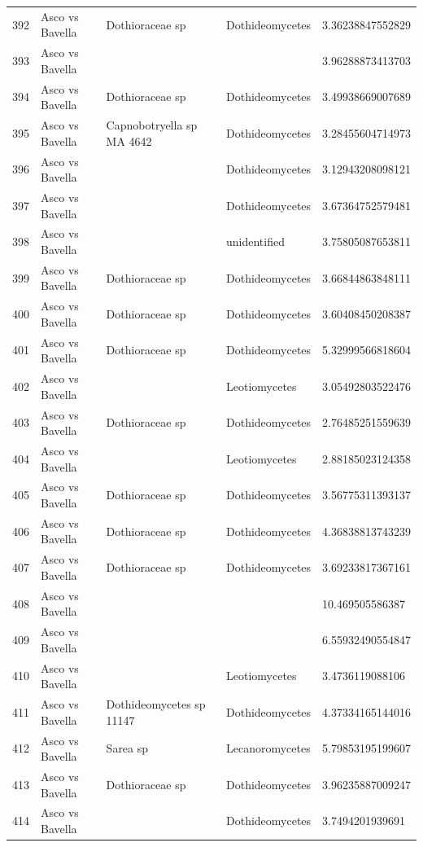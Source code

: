 \documentclass[12pt]{article}\usepackage[]{graphicx}\usepackage[]{color}
\numberwithin{figure}{section}
\begin{document}
\begin{table}[ht]
\begin{tabular}{lllll}
  392 & Asco vs Bavella & Dothioraceae sp & Dothideomycetes & 3.36238847552829 \\ 
  393 & Asco vs Bavella &  &  & 3.96288873413703 \\ 
  394 & Asco vs Bavella & Dothioraceae sp & Dothideomycetes & 3.49938669007689 \\ 
  395 & Asco vs Bavella & Capnobotryella sp MA 4642 & Dothideomycetes & 3.28455604714973 \\ 
  396 & Asco vs Bavella &  & Dothideomycetes & 3.12943208098121 \\ 
  397 & Asco vs Bavella &  & Dothideomycetes & 3.67364752579481 \\ 
  398 & Asco vs Bavella &  & unidentified & 3.75805087653811 \\ 
  399 & Asco vs Bavella & Dothioraceae sp & Dothideomycetes & 3.66844863848111 \\ 
  400 & Asco vs Bavella & Dothioraceae sp & Dothideomycetes & 3.60408450208387 \\ 
  401 & Asco vs Bavella & Dothioraceae sp & Dothideomycetes & 5.32999566818604 \\ 
  402 & Asco vs Bavella &  & Leotiomycetes & 3.05492803522476 \\ 
  403 & Asco vs Bavella & Dothioraceae sp & Dothideomycetes & 2.76485251559639 \\ 
  404 & Asco vs Bavella &  & Leotiomycetes & 2.88185023124358 \\ 
  405 & Asco vs Bavella & Dothioraceae sp & Dothideomycetes & 3.56775311393137 \\ 
  406 & Asco vs Bavella & Dothioraceae sp & Dothideomycetes & 4.36838813743239 \\ 
  407 & Asco vs Bavella & Dothioraceae sp & Dothideomycetes & 3.69233817367161 \\ 
  408 & Asco vs Bavella &  &  & 10.469505586387 \\ 
  409 & Asco vs Bavella &  &  & 6.55932490554847 \\ 
  410 & Asco vs Bavella &  & Leotiomycetes & 3.4736119088106 \\ 
  411 & Asco vs Bavella & Dothideomycetes sp 11147 & Dothideomycetes & 4.37334165144016 \\ 
  412 & Asco vs Bavella & Sarea sp & Lecanoromycetes & 5.79853195199607 \\ 
  413 & Asco vs Bavella & Dothioraceae sp & Dothideomycetes & 3.96235887009247 \\ 
  414 & Asco vs Bavella &  & Dothideomycetes & 3.7494201939691 \\ 

\end{tabular}
\end{table}
\end{document}
